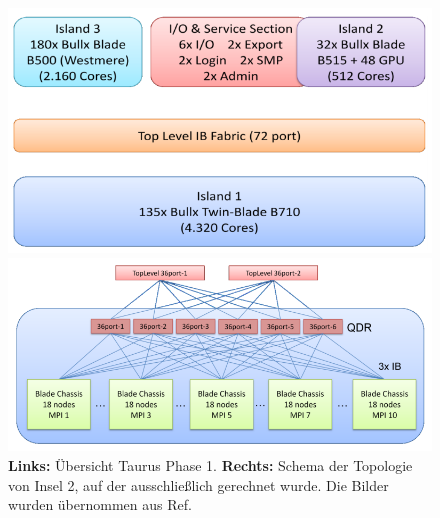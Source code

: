 \begin{figure}[H]
	\centering
	\begin{minipage}{0.5\linewidth}
		\includegraphics[width=\linewidth]{taurusphase1}
	\end{minipage}\begin{minipage}{0.5\linewidth}
		\includegraphics[width=\linewidth]{taurusphase1island1interconnects}
	\end{minipage}
	\caption{\textbf{Links:} Übersicht Taurus Phase 1. \textbf{Rechts:} Schema der Topologie von Insel 2, auf der ausschließlich gerechnet wurde. Die Bilder wurden übernommen aus Ref.\cite{taurusnutzerschulung}}
	\label{fig:taurusphase1}
\end{figure}

